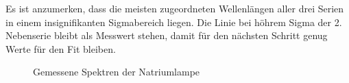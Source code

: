 \documentclass{article}
\begin{document}
\phantom{.}

Es ist anzumerken, dass die meisten zugeordneten Wellenlängen aller drei Serien in einem insignifikanten Sigmabereich liegen. Die Linie bei höhrem Sigma der 2. Nebenserie bleibt als Messwert stehen, damit für den nächsten Schritt genug Werte für den Fit bleiben.

\begin{figure}[p]
  \centering
  \hfill
  \hfill
  \hfill
  \hfill
  \caption{Gemessene Spektren der Natriumlampe}
  \label{fig:alleNatriumspektren}
\end{figure}
\end{document}
